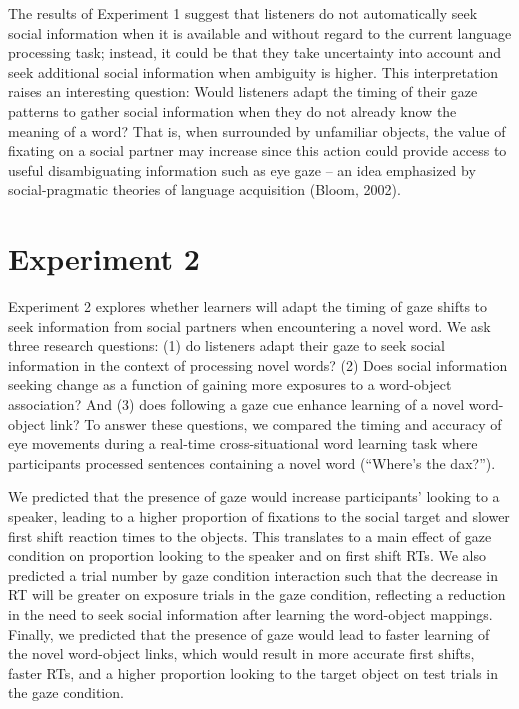 \documentclass[10pt, letterpaper]{article}
\begin{document}
The results of Experiment 1 suggest that listeners do not automatically
seek social information when it is available and without regard to the
current language processing task; instead, it could be that they take
uncertainty into account and seek additional social information when
ambiguity is higher. This interpretation raises an interesting question:
Would listeners adapt the timing of their gaze patterns to gather social
information when they do not already know the meaning of a word? That
is, when surrounded by unfamiliar objects, the value of fixating on a
social partner may increase since this action could provide access to
useful disambiguating information such as eye gaze -- an idea emphasized
by social-pragmatic theories of language acquisition (Bloom, 2002).

\hypertarget{experiment-2}{%
\section{Experiment 2}\label{experiment-2}}

Experiment 2 explores whether learners will adapt the timing of gaze
shifts to seek information from social partners when encountering a
novel word. We ask three research questions: (1) do listeners adapt
their gaze to seek social information in the context of processing novel
words? (2) Does social information seeking change as a function of
gaining more exposures to a word-object association? And (3) does
following a gaze cue enhance learning of a novel word-object link? To
answer these questions, we compared the timing and accuracy of eye
movements during a real-time cross-situational word learning task where
participants processed sentences containing a novel word (``Where's the
dax?'').

We predicted that the presence of gaze would increase participants'
looking to a speaker, leading to a higher proportion of fixations to the
social target and slower first shift reaction times to the objects. This
translates to a main effect of gaze condition on proportion looking to
the speaker and on first shift RTs. We also predicted a trial number by
gaze condition interaction such that the decrease in RT will be greater
on exposure trials in the gaze condition, reflecting a reduction in the
need to seek social information after learning the word-object mappings.
Finally, we predicted that the presence of gaze would lead to faster
learning of the novel word-object links, which would result in more
accurate first shifts, faster RTs, and a higher proportion looking to
the target object on test trials in the gaze condition.
\end{document}
